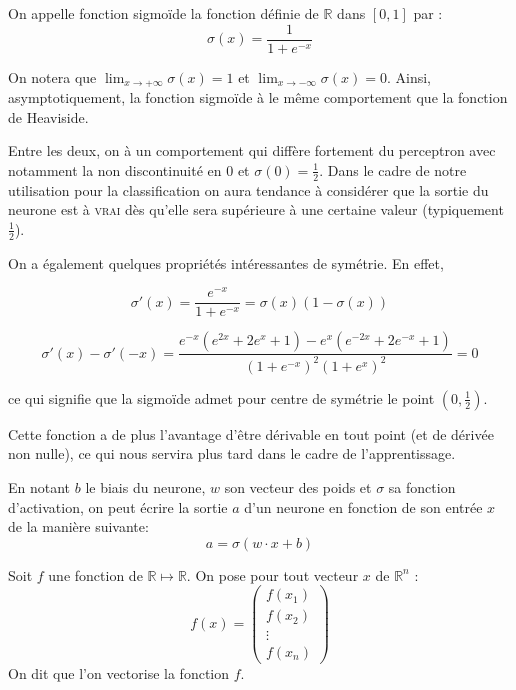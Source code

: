 \begin{definition}
On appelle fonction sigmoïde la fonction définie de $\mathbb{R}$ dans $[0, 1]$ par :
\[
\sigma(x) = \frac{1}{1 + e^{-x}}
\]
\end{definition}

On notera que $\lim_{x \to +\infty} \sigma(x) = 1$ et $\lim_{x \to -\infty} \sigma(x) = 0$. 
Ainsi, asymptotiquement, la fonction sigmoïde à le même comportement que la fonction 
de Heaviside.

Entre les deux, on à un comportement qui diffère fortement du perceptron avec notamment 
la non discontinuité en 0 et $\sigma(0) = \frac{1}{2}$. 
Dans le cadre de notre utilisation pour la classification on aura tendance 
à considérer que la sortie du neurone est à \textsc{vrai} dès qu'elle sera supérieure 
à une certaine valeur (typiquement $\frac{1}{2}$).

On a également quelques propriétés intéressantes de symétrie. En effet,

\[
\sigma'(x) = \frac{e^{-x}}{1 + e^{-x}} = \sigma(x) (1 - \sigma(x))
\]

\[
\sigma'(x) - \sigma'(-x) = \frac{e^{-x}(e^{2x} + 2 e^{x} + 1) - e^{x}(e^{-2x} + 2 e^{-x} + 1)}{(1+e^{-x})^2 (1+e^{x})^2} = 0
\]

ce qui signifie que la sigmoïde admet pour centre de symétrie le point $(0, \frac{1}{2})$.

Cette fonction a de plus l'avantage d'être dérivable en tout point (et de dérivée non nulle), 
ce qui nous servira plus tard dans le cadre de l'apprentissage.


\begin{definition}
En notant $b$ le biais du neurone, $w$ son vecteur des poids et $\sigma$ sa fonction 
d'activation, on peut écrire la sortie $a$ d'un neurone en fonction de son entrée $x$ 
de la manière suivante:
\[
a = \sigma(w \cdot x + b)
\]
\end{definition}


\begin{definition}
Soit $f$ une fonction de $\mathbb{R} \mapsto \mathbb{R}$. 
On pose pour tout vecteur $x$ de $\mathbb{R}^n$ :
\[
f(x) = 
\begin{pmatrix}
f(x_1) \\
f(x_2) \\
\vdots \\
f(x_n)
\end{pmatrix}
\]
On dit que l'on vectorise la fonction $f$.
\end{definition}

